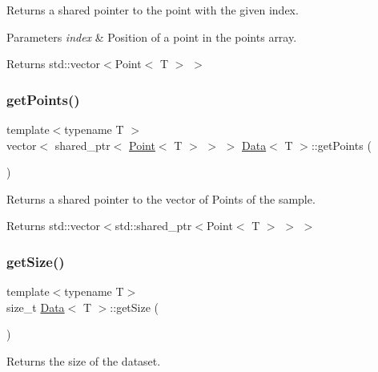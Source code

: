 Returns a shared pointer to the point with the given index. 


\begin{DoxyParams}{Parameters}
{\em index} & Position of a point in the points array. \\
\hline
\end{DoxyParams}
\begin{DoxyReturn}{Returns}
std\+::vector$<$Point$<$ T $>$ $>$ 
\end{DoxyReturn}
\mbox{\label{class_data_a63a36fcbe42e0956d602f11af0d2009e}} 
\subsubsection{\texorpdfstring{get\+Points()}{getPoints()}}
{\footnotesize\ttfamily template$<$typename T $>$ \\
vector$<$ shared\+\_\+ptr$<$ \hyperlink{class_point}{Point}$<$ T $>$ $>$ $>$ \hyperlink{class_data}{Data}$<$ T $>$\+::get\+Points (\begin{DoxyParamCaption}{ }\end{DoxyParamCaption})}



Returns a shared pointer to the vector of Points of the sample. 

\begin{DoxyReturn}{Returns}
std\+::vector$<$std\+::shared\+\_\+ptr$<$Point$<$ T $>$ $>$ $>$ 
\end{DoxyReturn}
\mbox{\label{class_data_a310d4da4294cb3576a2faf0809c91b1e}} 
\subsubsection{\texorpdfstring{get\+Size()}{getSize()}}
{\footnotesize\ttfamily template$<$typename T$>$ \\
size\+\_\+t \hyperlink{class_data}{Data}$<$ T $>$\+::get\+Size (\begin{DoxyParamCaption}{ }\end{DoxyParamCaption})\hspace{0.3cm}{\ttfamily [inline]}}



Returns the size of the dataset. 

